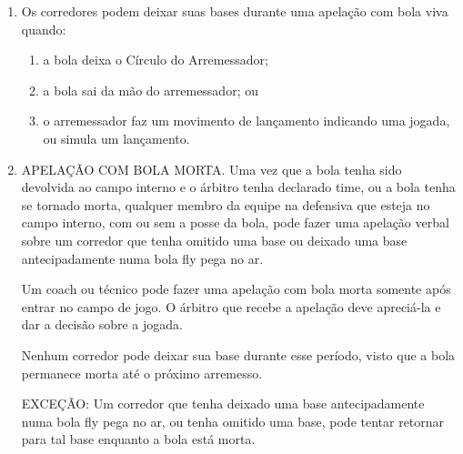 \begin{multicols}{2}
\begin{enumerate}[label=\alph*)]
	\begin{enumerate}[label=\roman* -]
		\item antes do próximo arremesso (legal ou ilegal), exceto em apela\c{c}\~ao sobre um Substituto Ilegal, Jogador N\~ao Anunciado, Reingresso Ilegal, Jogador de Emerg\^encia ou Jogador Removido e jogadores que mudam de posi\c{c}\~oes nas bases; 
		\item antes que todos os jogadores da defensiva tenham deixado o território \gls{fair}, a caminho do \gls{bench} ou da \'area do \Gls{dugout} (se um defensor faz a apela\c{c}\~ao, ele tem de estar no campo interno quando se manifesta ao \'arbitro); ou 
		\item no caso do \'ultimo lance do jogo, antes que os \'arbitros tenham deixado o campo de jogo. 
	\end{enumerate}
	\item  Os corredores podem deixar suas bases durante uma apela\c{c}\~ao com bola viva quando: 
	\begin{enumerate}[label=\roman* -]
		\item a bola deixa o C\'irculo do Arremessador; 
		\item a bola sai da m\~ao do arremessador; ou 
		\item o arremessador faz um movimento de lan\c{c}amento indicando uma jogada, ou simula um lan\c{c}amento. 
	\end{enumerate}

	\item  APELA\c{C}\~AO COM BOLA MORTA. Uma vez que a bola tenha sido devolvida ao campo interno e o \'arbitro tenha declarado \gls{time}, ou a bola tenha se tornado morta, qualquer membro da equipe na defensiva que esteja no campo interno, com ou sem a posse da bola, pode fazer uma apela\c{c}\~ao verbal sobre um corredor que tenha omitido uma base ou deixado uma base antecipadamente numa bola \gls{fly} pega no ar. 
	
	Um \gls{coach} ou t\'ecnico pode fazer uma apela\c{c}\~ao com bola morta somente após entrar no campo de jogo. O \'arbitro que recebe a apela\c{c}\~ao deve apreci\'a-la e dar a decis\~ao sobre a jogada. 
	
	Nenhum corredor pode deixar sua base durante esse per\'iodo, visto que a bola permanece morta at\'e o próximo arremesso. 
	
EXCE\c{C}\~AO: Um corredor que tenha deixado uma base antecipadamente numa bola \gls{fly} pega no ar, ou tenha omitido uma base, pode tentar retornar para tal base enquanto a bola est\'a morta. 


\end{enumerate}
\end{multicols}
